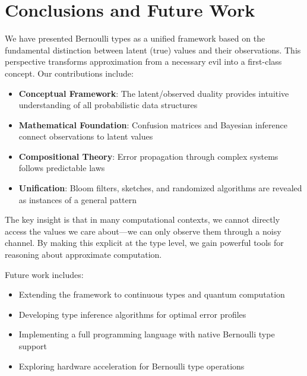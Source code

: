 \documentclass[11pt,final,hidelinks]{article}
\begin{document}
\section{Conclusions and Future Work}

We have presented Bernoulli types as a unified framework based on the fundamental distinction between latent (true) values and their observations. This perspective transforms approximation from a necessary evil into a first-class concept. Our contributions include:

\begin{itemize}
    \item \textbf{Conceptual Framework}: The latent/observed duality provides intuitive understanding of all probabilistic data structures
    \item \textbf{Mathematical Foundation}: Confusion matrices and Bayesian inference connect observations to latent values
    \item \textbf{Compositional Theory}: Error propagation through complex systems follows predictable laws
    \item \textbf{Unification}: Bloom filters, sketches, and randomized algorithms are revealed as instances of a general pattern
\end{itemize}

The key insight is that in many computational contexts, we cannot directly access the values we care about—we can only observe them through a noisy channel. By making this explicit at the type level, we gain powerful tools for reasoning about approximate computation.

Future work includes:
\begin{itemize}
    \item Extending the framework to continuous types and quantum computation
    \item Developing type inference algorithms for optimal error profiles
    \item Implementing a full programming language with native Bernoulli type support
    \item Exploring hardware acceleration for Bernoulli type operations
\end{itemize}




\end{document}
